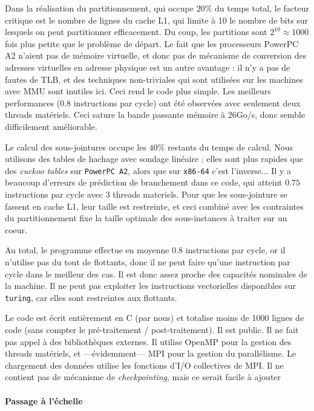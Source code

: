 \documentclass[
    a4paper, 
    12pt, onecolumn,
]{article}
\begin{document}
Dans la réalisation du partitionnement, qui occupe $20\%$ du temps total, le
facteur critique est le nombre de lignes du cache L1, qui limite à 10 le nombre
de bits sur lesquels on peut partitionner efficacement. Du coup, les partitions
sont $2^{10} \approx 1000$ fois plus petite que le problème de départ. Le fait
que les processeurs \textsf{PowerPC A2} n'aient pas de mémoire virtuelle, et
donc pas de mécanisme de conversion des adresses virtuelles en adresse physique
est un autre avantage : il n'y a pas de fautes de TLB, et des techniques
non-triviales qui sont utilisées sur les machines avec MMU sont inutiles
ici. Ceci rend le code plus simple. Les meilleurs performances ($0.8$
instructions par cycle) ont été observées avec seulement deux threads
matériels. Ceci sature la bande passante mémoire à 26Go/s, donc semble
difficilement améliorable.

Le calcul des sous-jointures occupe les $40\%$ restants du temps de calcul. Nous
utilisons des tables de hachage avec sondage linéaire : elles sont plus rapides
que des \emph{cuckoo tables} sur \texttt{PowerPC A2}, alors que sur
\texttt{x86-64} c'est l'inverse... Il y a beaucoup d'erreurs de prédiction de
branchement dans ce code, qui atteint $0.75$ instructions par cycle avec 3
threads materiels. Pour que les sous-jointure se fassent en cache L1, leur
taille est restreinte, et ceci combiné avec les contraintes du partitionnement
fixe la taille optimale des sous-instances à traiter sur un coeur.

Au total, le programme effectue en moyenne 0.8 instructions par cycle, or il
n'utilise pas du tout de flottants, donc il ne peut faire qu'une instruction par
cycle dans le meilleur des cas. Il est donc assez proche des capacités nominales
de la machine. Il ne peut pas exploiter les instructions vectorielles
disponibles sur \texttt{turing}, car elles sont restreintes aux flottants.

Le code est écrit entièrement en \textsf{C} (par nous) et totalise moins de 1000
lignes de code (sans compter le pré-traitement / post-traitement). Il est
public. Il ne fait pas appel à des bibliothèques externes. Il utilise
\textsf{OpenMP} pour la gestion des threads matériels, et ---évidemment---
\textsf{MPI} pour la gestion du parallélisme. Le chargement des données utilise
les fonctions d'\textsf{I/O} collectives de \textsf{MPI}. Il ne contient pas de
mécanisme de \emph{checkpointing}, mais ce serait facile à ajouter

\paragraph{Passage à l'échelle}
\end{document}
